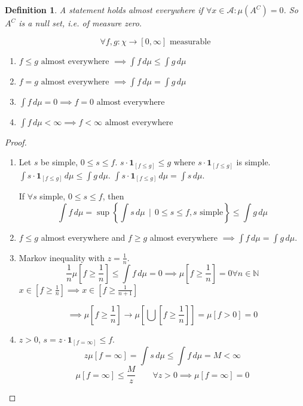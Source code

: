 \documentclass[a4paper]{article}
\newcounter{lecref}[section]
\numberwithin{lecref}{section}
\theoremstyle{break}
\newtheorem{definition}[lecref]{Definition}
\newcommand{\SetDef}[2]{\left\{#1\,\mid\,#2\right\}}
\begin{document}
\begin{definition}
  A statement holds \emph{almost everywhere} if $\forall x \in \mathcal A: \mu(A^C) = 0$. So $A^C$ is a null set, i.e. of measure zero.
\end{definition}

\begin{theorem}
  \[ \forall f, g: \chi \to [0, \infty] \text{ measurable} \]
  \begin{enumerate}
    \item $f \leq g \text{ almost everywhere } \implies \int f \, d\mu \leq \int g \, d\mu$
    \item $f = g \text{ almost everywhere } \implies \int f \, d\mu = \int g \, d\mu$
    \item $\int f \, d\mu = 0 \implies f = 0 \text{ almost everywhere}$
    \item $\int f \, d\mu < \infty \implies f < \infty \text{ almost everywhere}$
  \end{enumerate}
\end{theorem}
\begin{proof}
  \begin{enumerate}
    \item
      Let $s$ be simple, $0 \leq s \leq f$. $s \cdot \mathbf{1}_{[f \leq g]} \leq g$ where $s \cdot \mathbf{1}_{[f \leq g]}$ is simple. $\int s \cdot \mathbf 1_{[f \leq g]} \, d\mu \leq \int g \, d\mu$. $\int s \cdot \mathbf 1_{[f \leq g]} \, d\mu = \int s \, d\mu$.

      If $\forall s$ simple, $0 \leq s \leq f$, then
      \[ \int f \, d\mu = \sup\SetDef{\int s \, d\mu}{0 \leq s \leq f, s \text{ simple}} \leq \int g \, d\mu \]
    \item 
      $f \leq g$ almost everywhere and $f \geq g$ almost everywhere $\implies \int f \, d\mu = \int g \, d\mu$.
    \item
      Markov inequality with $z = \frac1n$.
      \[ \frac1n \mu\left[f \geq \frac1n\right] \leq \int f \, d\mu = 0 \implies \mu\left[f \geq \frac1n\right] = 0 \forall n \in \mathbb N \]
      $x \in \left[f \geq \frac1n\right] \implies x \in \left[f \geq \frac{1}{n+1}\right]$

      \[ \implies \mu\left[f \geq \frac{1}{n}\right] \to \mu\left[\bigcup\left[f \geq \frac1n\right]\right] = \mu\left[f > 0\right] = 0 \]
    \item
      $z > 0$, $s = z \cdot \mathbf 1_{[f = \infty]} \leq f$.
      \[ z \mu[f = \infty] = \int s \, d\mu \leq \int f \, d\mu = M < \infty \]
      \[ \mu[f = \infty] \leq \frac{M}{z} \qquad \forall z > 0 \implies \mu[f = \infty] = 0 \]
  \end{enumerate}
\end{proof}
\end{document}
